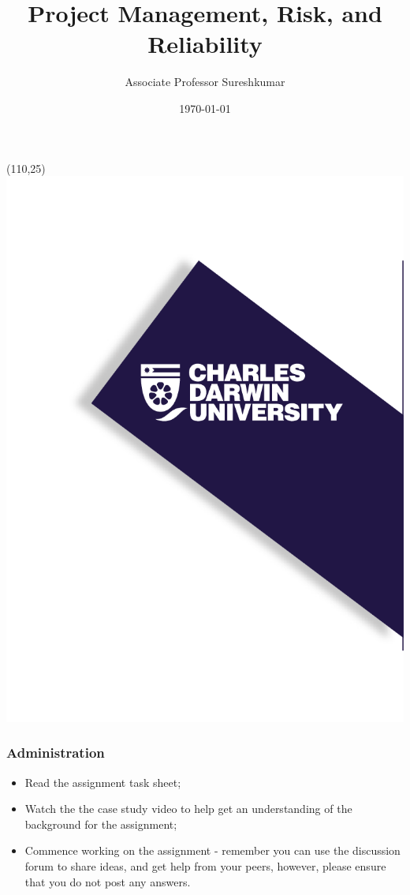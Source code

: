 \documentclass[aspectratio=169]{beamer}
\title[PRT551 - Lecture 2]{Project Management, Risk, and Reliability} %
\author{Associate Professor Sureshkumar} %
\institute[CDU] %
{
Charles Darwin University \\ %
\medskip
\textit{cdux@cdu.edu.au} %
}
\date{\today} %
\begin{document}
\begin{frame}
\titlepage %
\begin{textblock}{20}(110,25)
      \includegraphics[scale=0.8]{logo_1.png}
\end{textblock}
\end{frame}




\begin{frame}
\frametitle{Administration}
\begin{itemize}
\item Read the assignment task sheet;
\item Watch the the case study video to help get an understanding of the background for the assignment;
\item Commence working on the assignment - remember you can use the discussion forum to share ideas, and get help from your peers, however, please ensure that you do not post any answers.
\end{itemize}
\end{frame}
\end{document}
